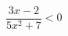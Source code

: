 \begin{ex}[type=inequality]
	\begin{condition}
		\( \dfrac{3x-2}{5x^2+7}<0 \)
	\end{condition}
\end{ex}